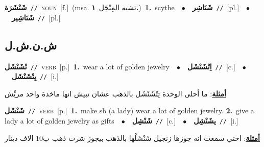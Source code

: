 \documentclass[10pt,a4paper,twoside]{article} %
\begin{document}
\begin{multicols}{2}
{\setlength\topsep{0pt}\textbf{\foreignlanguage{arabic}{شَنْشَرَة}}\ {\color{gray}\texttt{//}\color{black}}\ \textsc{noun}\ [f.]\ \color{gray}(msa. \foreignlanguage{arabic}{تشبه المِنْجَل}~\foreignlanguage{arabic}{\textbf{١.}})\color{black}\ \textbf{1.}~scythe\ \ $\bullet$\ \ \setlength\topsep{0pt}\textbf{\foreignlanguage{arabic}{شَنَاشِر}}\ {\color{gray}\texttt{//}\color{black}}\ [pl.]\ \ $\bullet$\ \ \setlength\topsep{0pt}\textbf{\foreignlanguage{arabic}{شَنَاشِير}}\ {\color{gray}\texttt{//}\color{black}}\ [pl.]\ } \vspace{2mm}

\vspace{-3mm}
\subsection*{\color{blue}\foreignlanguage{arabic}{ش.ن.ش.ل}\color{blue}{}} 

{\setlength\topsep{0pt}\textbf{\foreignlanguage{arabic}{تْشَنْشَل}}\ {\color{gray}\texttt{//}\color{black}}\ \textsc{verb}\ [p.]\ \textbf{1.}~wear a lot of golden jewelry\ \ $\bullet$\ \ \setlength\topsep{0pt}\textbf{\foreignlanguage{arabic}{اِتْشَنْشَل}}\ {\color{gray}\texttt{//}\color{black}}\ [c.]\ \ $\bullet$\ \ \setlength\topsep{0pt}\textbf{\foreignlanguage{arabic}{يِتْشَنْشَل}}\ {\color{gray}\texttt{//}\color{black}}\ [i.]\  \begin{flushright}\color{gray}\foreignlanguage{arabic}{\textbf{\underline{\foreignlanguage{arabic}{أمثلة}}}: ما أحلى الوحدة تِتْشَنْشَل بالذهب عشان تبيش انها ماخدة واحد مريِّش}\end{flushright}\color{black}} \vspace{2mm}

{\setlength\topsep{0pt}\textbf{\foreignlanguage{arabic}{شَنْشَل}}\ {\color{gray}\texttt{//}\color{black}}\ \textsc{verb}\ [p.]\ \textbf{1.}~make sb (a lady) wear a lot of golden jewelry.  \textbf{2.}~give a lady a lot of golden jewelry as gifts\ \ $\bullet$\ \ \setlength\topsep{0pt}\textbf{\foreignlanguage{arabic}{شَنْشِل}}\ {\color{gray}\texttt{//}\color{black}}\ [c.]\ \ $\bullet$\ \ \setlength\topsep{0pt}\textbf{\foreignlanguage{arabic}{يشَنْشِل}}\ {\color{gray}\texttt{//}\color{black}}\ [i.]\  \begin{flushright}\color{gray}\foreignlanguage{arabic}{\textbf{\underline{\foreignlanguage{arabic}{أمثلة}}}: اختي سمعت انه جوزها زنجيل شَنْشَلْها بالذهب بيجوز شرت ذهب ب10 الاف دينار}\end{flushright}\color{black}} \vspace{2mm}


\end{multicols}
\end{document}
